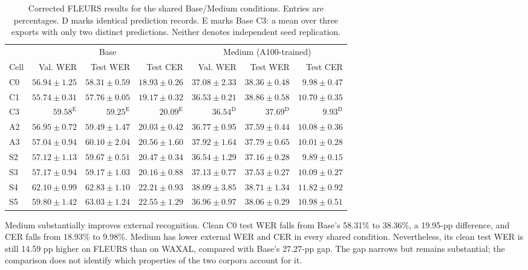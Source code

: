 \documentclass[12pt,a4paper]{report}
\begin{document}
\begin{table}[htbp]\centering\scriptsize
\caption{Corrected FLEURS results for the shared Base/Medium conditions.
Entries are percentages. D marks identical prediction records. E marks Base C3: a mean over three
exports with only two distinct predictions. Neither denotes independent seed replication.}
\label{tab:fleurs}
\setlength{\tabcolsep}{3pt}
\begin{tabular}{lrrrrrr}\toprule
 & \multicolumn{3}{c}{Base} & \multicolumn{3}{c}{Medium (A100-trained)}\\
Cell & Val. WER & Test WER & Test CER & Val. WER & Test WER & Test CER\\\midrule
C0 & $56.94 \pm 1.25$ & $58.31 \pm 0.59$ & $18.93 \pm 0.26$ & $37.08 \pm 2.33$ & $38.36 \pm 0.48$ & $9.98 \pm 0.47$ \\
C1 & $55.74 \pm 0.31$ & $57.76 \pm 0.05$ & $19.17 \pm 0.32$ & $36.53 \pm 0.21$ & $38.86 \pm 0.58$ & $10.70 \pm 0.35$ \\
C3 & $59.58^{\mathrm{E}}$ & $59.25^{\mathrm{E}}$ & $20.09^{\mathrm{E}}$ & $36.54^{\mathrm{D}}$ & $37.69^{\mathrm{D}}$ & $9.93^{\mathrm{D}}$ \\
A2 & $56.95 \pm 0.72$ & $59.49 \pm 1.47$ & $20.03 \pm 0.42$ & $36.77 \pm 0.95$ & $37.59 \pm 0.44$ & $10.08 \pm 0.36$ \\
A3 & $57.04 \pm 0.94$ & $60.10 \pm 2.04$ & $20.56 \pm 1.60$ & $37.92 \pm 1.64$ & $37.79 \pm 0.65$ & $10.01 \pm 0.28$ \\
S2 & $57.12 \pm 1.13$ & $59.67 \pm 0.51$ & $20.47 \pm 0.34$ & $36.54 \pm 1.29$ & $37.16 \pm 0.28$ & $9.89 \pm 0.15$ \\
S3 & $57.17 \pm 0.94$ & $59.17 \pm 1.03$ & $20.16 \pm 0.88$ & $37.13 \pm 0.77$ & $37.53 \pm 0.27$ & $10.09 \pm 0.27$ \\
S4 & $62.10 \pm 0.99$ & $62.83 \pm 1.10$ & $22.21 \pm 0.93$ & $38.09 \pm 3.85$ & $38.71 \pm 1.34$ & $11.82 \pm 0.92$ \\
S5 & $59.80 \pm 1.42$ & $63.03 \pm 1.24$ & $22.55 \pm 1.29$ & $36.96 \pm 0.97$ & $38.06 \pm 0.29$ & $10.98 \pm 0.51$ \\
\bottomrule\end{tabular}\end{table}

Medium substantially improves external recognition. Clean C0 test WER falls
from Base's 58.31\% to 38.36\%, a 19.95-pp difference, and CER falls from
18.93\% to 9.98\%. Medium has lower external WER and CER in every shared
condition. Nevertheless, its clean test WER is still 14.59 pp higher on
FLEURS than on WAXAL, compared with Base's 27.27-pp gap. The gap narrows
but remains substantial; the comparison does not identify which properties
of the two corpora account for it.
\end{document}
